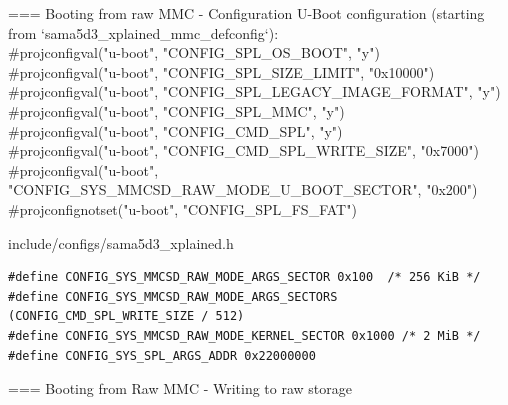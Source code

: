 === Booting from raw MMC - Configuration
	\small
	U-Boot configuration (starting from
        `sama5d3_xplained_mmc_defconfig`):\\
	#projconfigval("u-boot", "CONFIG_SPL_OS_BOOT", "y")\\
	#projconfigval("u-boot", "CONFIG_SPL_SIZE_LIMIT", "0x10000")\\
	#projconfigval("u-boot", "CONFIG_SPL_LEGACY_IMAGE_FORMAT", "y")\\
	#projconfigval("u-boot", "CONFIG_SPL_MMC", "y")\\
	#projconfigval("u-boot", "CONFIG_CMD_SPL", "y")\\
	#projconfigval("u-boot", "CONFIG_CMD_SPL_WRITE_SIZE", "0x7000")\\
	#projconfigval("u-boot", "CONFIG_SYS_MMCSD_RAW_MODE_U_BOOT_SECTOR", "0x200")\\
	#projconfignotset("u-boot", "CONFIG_SPL_FS_FAT")\\
        \begin{block}{include/configs/sama5d3\_xplained.h}
        \begin{verbatim}
#define CONFIG_SYS_MMCSD_RAW_MODE_ARGS_SECTOR 0x100  /* 256 KiB */
#define CONFIG_SYS_MMCSD_RAW_MODE_ARGS_SECTORS (CONFIG_CMD_SPL_WRITE_SIZE / 512)
#define CONFIG_SYS_MMCSD_RAW_MODE_KERNEL_SECTOR 0x1000 /* 2 MiB */
#define CONFIG_SYS_SPL_ARGS_ADDR 0x22000000
	\end{verbatim}
	\end{block}


=== Booting from Raw MMC - Writing to raw storage
   \scriptsize
   
